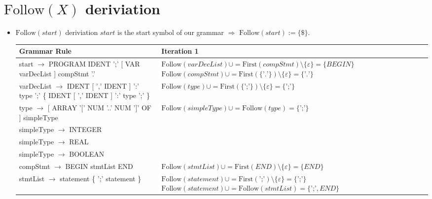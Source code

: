 \documentclass[8pt]{scrartcl}
\newcommand{\First}[1]{\mathrm{First}(#1)}
\newcommand{\Follow}[1]{\mathrm{Follow}(#1)}
\newcommand{\epsset}{\{\varepsilon\}}
\begin{document}
    \section{$\Follow{X}$ \textbf{deriviation}}
        \begin{itemize}
            \item $\Follow{start}$ deriviation\newline
                $start$ is the start symbol of our grammar $\Rightarrow$ $\Follow{start} := \{\$\}$.\newline
                \begin{tabular}{|l|l|}
                    \hline
                    \textbf{Grammar Rule} & \textbf{Iteration 1}\\
                    \hline
                    start $\rightarrow$ PROGRAM IDENT ';' [ VAR varDecList ] compStmt '.' & \makecell[l]{$\Follow{varDecList} \cup = \First{compStmt} \setminus \epsset = \{BEGIN\}$\\
                                                                                     $\Follow{compStmt} \cup = \First{\{\text{'.'}\}} \setminus \epsset = \{\text{'.'}\}$
                                                                                    }\\
                    \hline
                    \makecell[l]{varDecList $\rightarrow$ IDENT [ ',' IDENT ]\\ ':' type ';' \{ IDENT [ ',' IDENT ] ':' type ';' \}} & $\Follow{type} \cup = \First{\{\text{';'}\}} \setminus \epsset = \{\text{';'}\}$\\
                    \hline
                    type $\rightarrow$ [ ARRAY '$[$' NUM '..' NUM '$]$' OF ] simpleType & $\Follow{simpleType} \cup = \Follow{type} = \{\text{';'\}}$\\
                    \hline
                    simpleType $\rightarrow$ INTEGER &\\
                    \hline
                    simpleType $\rightarrow$ REAL &\\
                    \hline
                    simpleType $\rightarrow$ BOOLEAN &\\
                    \hline
                    compStmt $\rightarrow$ BEGIN stmtList END & $\Follow{stmtList} \cup = \First{END} \setminus \epsset = \{END\}$\\
                    \hline
                    stmtList $\rightarrow$ statement \{ ';' statement \} & \makecell[l]{$\Follow{statement} \cup = \First{\text{';'}}\setminus \epsset = \{\text{';'}\}$\\ $\Follow{statement} \cup = \Follow{stmtList} = \{\text{';'}, END\}$}\\

\end{tabular}
\end{itemize}
\end{document}
